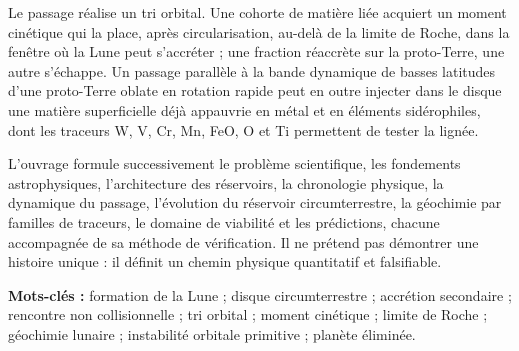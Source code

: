 \documentclass[11pt,a4paper,openany]{report}
\begin{document}
Le passage réalise un tri orbital. Une cohorte de matière liée acquiert un moment cinétique qui
la place, après circularisation, au-delà de la limite de Roche, dans la fenêtre où la Lune peut
s'accréter ; une fraction réaccrète sur la proto-Terre, une autre s'échappe. Un passage parallèle
à la bande dynamique de basses latitudes d'une proto-Terre oblate en rotation rapide peut
en outre injecter dans
le disque une matière superficielle déjà appauvrie en métal et en éléments sidérophiles, dont les
traceurs W, V, Cr, Mn, FeO, O et Ti permettent de tester la lignée.

L'ouvrage formule successivement le problème scientifique, les fondements astrophysiques,
l'architecture des réservoirs, la chronologie physique, la dynamique du passage, l'évolution du
réservoir circumterrestre, la géochimie par familles de traceurs, le domaine de viabilité et les
prédictions, chacune accompagnée de sa méthode de vérification. Il ne prétend pas démontrer
une histoire unique : il définit un chemin physique quantitatif et falsifiable.

\bigskip
\noindent\textbf{Mots-clés :} formation de la Lune ; disque circumterrestre ; accrétion secondaire ;
rencontre non collisionnelle ; tri orbital ; moment cinétique ; limite de Roche ; géochimie lunaire ; instabilité orbitale primitive ; planète éliminée.
\end{document}
